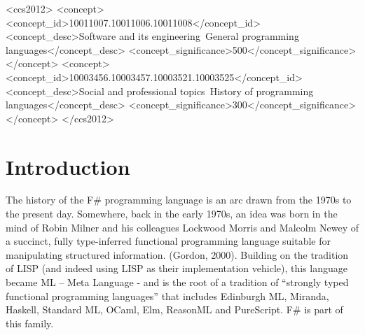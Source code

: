 \documentclass[acmsmall,review]{acmart}\settopmatter{printfolios=true,printccs=false,printacmref=false}
\begin{document}
\begin{CCSXML}
<ccs2012>
<concept>
<concept_id>10011007.10011006.10011008</concept_id>
<concept_desc>Software and its engineering~General programming languages</concept_desc>
<concept_significance>500</concept_significance>
</concept>
<concept>
<concept_id>10003456.10003457.10003521.10003525</concept_id>
<concept_desc>Social and professional topics~History of programming languages</concept_desc>
<concept_significance>300</concept_significance>
</concept>
</ccs2012>
\end{CCSXML}





\maketitle


\section*{Introduction}

The history of the F\# programming language is an arc drawn from the 1970s to the present day.  Somewhere, back in the early 1970s, an idea was born in the mind of Robin Milner and his colleagues Lockwood Morris and Malcolm Newey of a succinct, fully type-inferred functional programming language suitable for manipulating structured information. (Gordon, 2000).  Building on the tradition of LISP (and indeed using LISP as their implementation vehicle), this language became ML – Meta Language - and is the root of a tradition of “strongly typed functional programming languages” that includes Edinburgh ML, Miranda, Haskell, Standard ML, OCaml, Elm, ReasonML and PureScript. F\# is part of this family.
\end{document}
